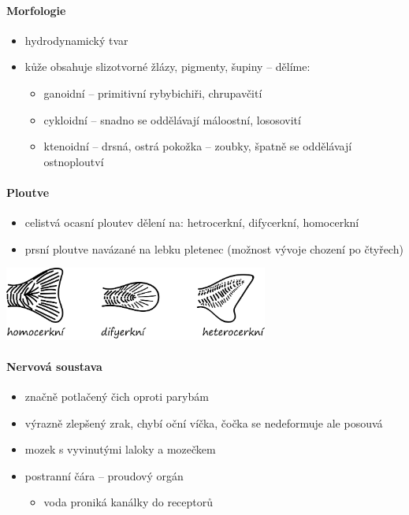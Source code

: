 \paragraph{Morfologie}
\begin{itemize}
\item hydrodynamický tvar
\item kůže obsahuje slizotvorné žlázy, pigmenty, šupiny -- dělíme:
	\begin{itemize}
	\item ganoidní  -- primitivní ryby\ra bichiři, chrupavčití
	\item cykloidní -- snadno se oddělávají \ra máloostní, lososovití
	\item ktenoidní -- drsná, ostrá pokožka -- zoubky, špatně se oddělávají \ra ostnoploutví
	\end{itemize}
\end{itemize}

\paragraph{Ploutve}
\begin{itemize}
\item celistvá ocasní ploutev dělení na: hetrocerkní, difycerkní, homocerkní
\item prsní ploutve navázané na lebku  \ra pletenec (možnost vývoje chození po čtyřech)
\end{itemize}
\includegraphics[width=0.65\textwidth]{pictures/ocasni_ploutve.png}

\paragraph{Nervová soustava}
\begin{itemize}
\item značně potlačený čich oproti parybám
\item výrazně zlepšený zrak, chybí oční víčka, čočka se nedeformuje ale posouvá
\item mozek s vyvinutými laloky a mozečkem
\item postranní čára -- proudový orgán
	\begin{itemize}
	\item voda proniká kanálky do receptorů 
	\end{itemize}
\end{itemize}

